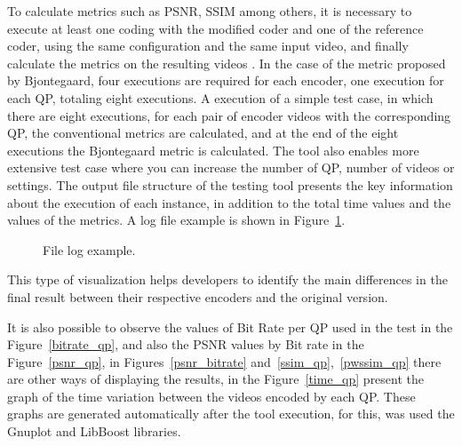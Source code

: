 \documentclass[journal]{IEEEtran}
\begin{document}
To calculate metrics such as PSNR, SSIM among others, it is necessary to execute at least one coding with the modified coder and one of the reference coder, using the same configuration and the same input video, and finally calculate the metrics on the resulting videos . In the case of the metric proposed by Bjontegaard, four executions are required for each encoder, one execution for each QP, totaling eight executions. A execution of a simple test case, in which there are eight executions, for each pair of encoder videos with the corresponding QP, the conventional metrics are calculated, and at the end of the eight executions the Bjontegaard metric is calculated. The tool also enables more extensive test case where you can increase the number of QP, number of videos or settings. The output file structure of the testing tool presents the key information about the execution of each instance, in addition to the total time values and the values of the metrics. A log file example is shown in Figure~\ref{fig:log}.

\FloatBarrier

\begin{figure}[!ht]
	\centering
	\caption{File log example.}
	\label{fig:log}
\end{figure}

\FloatBarrier

This type of visualization helps developers to identify the main differences in the final result between their respective encoders and the original version.

It is also possible to observe the values of Bit Rate per QP used in the test in the Figure~\ref{bitrate_qp}, and also the PSNR values by Bit rate in the Figure~\ref{psnr_qp}, in Figures~\ref{psnr_bitrate} and~\ref{ssim_qp},~\ref{pwssim_qp} there are other ways of displaying the results, in the Figure~\ref{time_qp} present the graph of the time variation between the videos encoded by each QP. These graphs are generated automatically after the tool execution, for this, was used the Gnuplot and LibBoost libraries.
\end{document}
